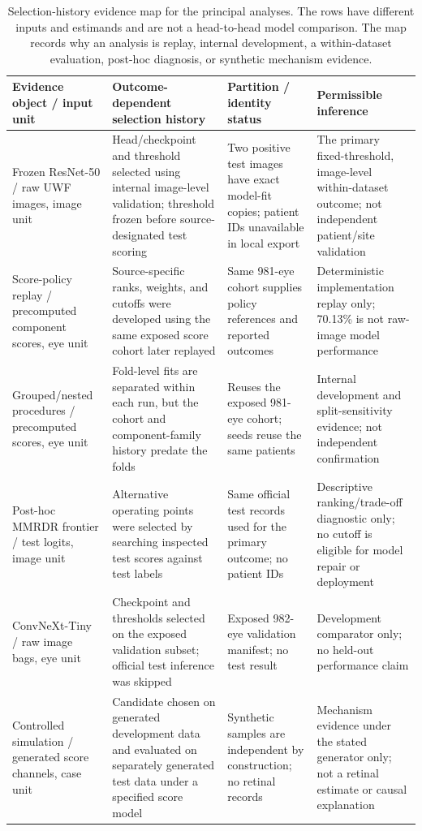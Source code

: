 \documentclass{ieeeaccess}
\begin{document}
\begin{table}[t]
\centering
\caption{Selection-history evidence map for the principal analyses. The rows have different inputs and estimands and are not a head-to-head model comparison. The map records why an analysis is replay, internal development, a within-dataset evaluation, post-hoc diagnosis, or synthetic mechanism evidence.}
\label{tab:replay-model-contrast}
\footnotesize
\setlength{\tabcolsep}{3pt}
\begin{tabularx}{\textwidth}{>{\raggedright\arraybackslash}p{}>{\raggedright\arraybackslash}p{}>{\raggedright\arraybackslash}p{}X}
\toprule
Evidence object / input unit & Outcome-dependent selection history & Partition / identity status & Permissible inference \\
\midrule
Frozen ResNet-50 / raw UWF images, image unit & Head/checkpoint and threshold selected using internal image-level validation; threshold frozen before source-designated test scoring & Two positive test images have exact model-fit copies; patient IDs unavailable in local export & The primary fixed-threshold, image-level within-dataset outcome; not independent patient/site validation \\
Score-policy replay / precomputed component scores, eye unit & Source-specific ranks, weights, and cutoffs were developed using the same exposed score cohort later replayed & Same 981-eye cohort supplies policy references and reported outcomes & Deterministic implementation replay only; 70.13\% is not raw-image model performance \\
Grouped/nested procedures / precomputed scores, eye unit & Fold-level fits are separated within each run, but the cohort and component-family history predate the folds & Reuses the exposed 981-eye cohort; seeds reuse the same patients & Internal development and split-sensitivity evidence; not independent confirmation \\
Post-hoc MMRDR frontier / test logits, image unit & Alternative operating points were selected by searching inspected test scores against test labels & Same official test records used for the primary outcome; no patient IDs & Descriptive ranking/trade-off diagnostic only; no cutoff is eligible for model repair or deployment \\
ConvNeXt-Tiny / raw image bags, eye unit & Checkpoint and thresholds selected on the exposed validation subset; official test inference was skipped & Exposed 982-eye validation manifest; no test result & Development comparator only; no held-out performance claim \\
Controlled simulation / generated score channels, case unit & Candidate chosen on generated development data and evaluated on separately generated test data under a specified score model & Synthetic samples are independent by construction; no retinal records & Mechanism evidence under the stated generator only; not a retinal estimate or causal explanation \\
\bottomrule
\end{tabularx}
\end{table}
\end{document}
